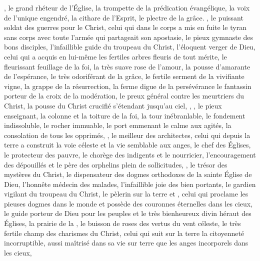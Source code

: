 , le grand rhéteur de l'Église, la trompette de la prédication évangélique, la voix de l'unique engendré, la cithare de l'Esprit, le plectre de la grâce. 
, le puissant soldat des guerres pour le Christ, 
celui qui dans le corps a mis en fuite le tyran sans corps avec toute l'armée qui partageait son apostasie, 
le pieux gymnaste des bons disciples,
l'infaillible guide du troupeau du Christ,
l'éloquent verger de Dieu,
celui qui a acquis en lui-même les fertiles arbres fleuris de tout mérite,
le fleurissant feuillage de la foi,
la très suave rose de l'amour, %
la pousse d'amarante de l'espérance, 
le très odoriférant  de la grâce,
le fertile serment de la vivifiante vigne,
la  grappe de la résurrection, 
la ferme digue de la persévérance %
le fantassin porteur de la croix de la modération, %
le preux général contre les meurtriers du Christ,
la pousse du Christ crucifié s'étendant jusqu'au ciel,
, ,
le pieux enseignant,
la colonne et la toiture de la foi,
la tour inébranlable, %
le fondement indissoluble, %
le rocher immuable, %
le port emmenant le calme aux agités,  %
la consolation de tous les opprimés,
,
le meilleur des architectes, celui qui  depuis la terre a construit la voie céleste et la vie semblable aux anges,
le chef des Églises, %
le protecteur des pauvre, le chorège  des indigents et le  nourricier,
l'encouragement des dépouillés et le père des orphelins plein de sollicitudes, 
, le trésor des mystères du Christ,
le dispensateur des dogmes orthodoxes de la  sainte Église de Dieu,
l'honnête médecin des malades,
l'infaillible joie des bien portants,
le gardien vigilant  du troupeau du Christ, 
le pèlerin sur la terre et , 
celui qui proclame les pieuses dogmes dans le monde et possède des couronnes éternelles dans les cieux, 
le guide porteur de Dieu pour les peuples et le très bienheureux divin héraut des Églises,
la prairie de la ,
le buisson de roses des vertus du vent céleste,
le très fertile champ  des charismes du Christ,
celui qui suit sur la terre la citoyenneté incorruptible, aussi maîtrisé dans sa vie sur terre  que les anges incorporels dans les cieux, %
